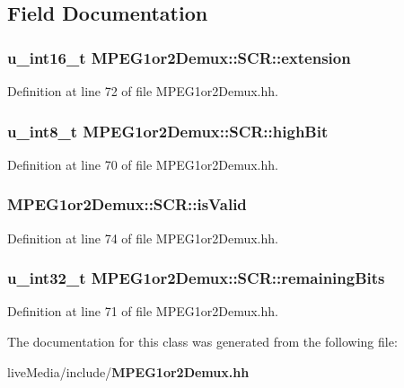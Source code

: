 \subsection{Field Documentation}
\subsubsection[{extension}]{\setlength{\rightskip}{0pt plus 5cm}u\+\_\+int16\+\_\+t M\+P\+E\+G1or2\+Demux\+::\+S\+C\+R\+::extension}\label{classMPEG1or2Demux_1_1SCR_a79c477f3318c0c28d98669687ba49751}


Definition at line 72 of file M\+P\+E\+G1or2\+Demux.\+hh.

\subsubsection[{high\+Bit}]{\setlength{\rightskip}{0pt plus 5cm}u\+\_\+int8\+\_\+t M\+P\+E\+G1or2\+Demux\+::\+S\+C\+R\+::high\+Bit}\label{classMPEG1or2Demux_1_1SCR_a5daec75dd0eef28db77a0aab6e05c215}


Definition at line 70 of file M\+P\+E\+G1or2\+Demux.\+hh.

\subsubsection[{is\+Valid}]{ M\+P\+E\+G1or2\+Demux\+::\+S\+C\+R\+::is\+Valid}\label{classMPEG1or2Demux_1_1SCR_ab3622ee25e6210bfa57cb40120d8269e}


Definition at line 74 of file M\+P\+E\+G1or2\+Demux.\+hh.

\subsubsection[{remaining\+Bits}]{\setlength{\rightskip}{0pt plus 5cm}u\+\_\+int32\+\_\+t M\+P\+E\+G1or2\+Demux\+::\+S\+C\+R\+::remaining\+Bits}\label{classMPEG1or2Demux_1_1SCR_aa65fbe90d2805402c461d09408e14b5b}


Definition at line 71 of file M\+P\+E\+G1or2\+Demux.\+hh.



The documentation for this class was generated from the following file\+:\begin{DoxyCompactItemize}
\item 
live\+Media/include/{\bf M\+P\+E\+G1or2\+Demux.\+hh}\end{DoxyCompactItemize}
